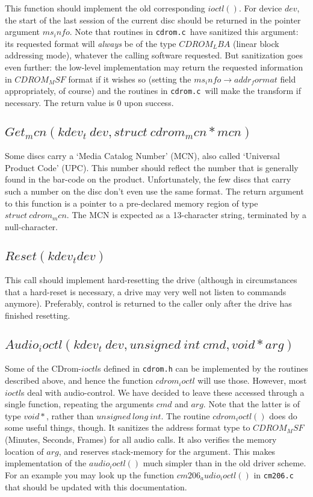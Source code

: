 \documentclass{article}
\def\cdrom{{\sc CDrom}}
\def\cdromc{{\tt cdrom.c}}
\begin{document}
This function should implement the old corresponding $ioctl()$. For
device $dev$, the start of the last session of the current disc should
be returned in the pointer argument $ms_info$. Note that routines in \cdromc\ have sanitized this argument: its
requested format will {\em always\/} be of the type $CDROM_LBA$
(linear block addressing mode), whatever the calling software
requested. But sanitization goes even further: the low-level
implementation may return the requested information in $CDROM_MSF$
format if it wishes so (setting the $ms_info\rightarrow addr_format$
field appropriately, of course) and the routines in \cdromc\ will make
the transform if necessary. The return value is 0 upon success.

\subsection{$Get_mcn(kdev_t\ dev, struct\ cdrom_mcn * mcn)$}

Some discs carry a `Media Catalog Number' (MCN), also called
`Universal Product Code' (UPC). This number should reflect the number that
is generally found in the bar-code on the product. Unfortunately, the
few discs that carry such a number on the disc don't even use the same
format. The return argument to this function is a pointer to a
pre-declared memory region of type $struct\ cdrom_mcn$. The MCN is
expected as a 13-character string, terminated by a null-character.

\subsection{$Reset(kdev_t dev)$}

This call should implement hard-resetting the drive (although in
circumstances that a hard-reset is necessary, a drive may very well
not listen to commands anymore). Preferably, control is returned to the
caller only after the drive has finished resetting.

\subsection{$Audio_ioctl(kdev_t\ dev, unsigned\ int\ cmd, void *
arg)$}

Some of the \cdrom-$ioctl$s defined in {\tt cdrom.h} can be
implemented by the routines described above, and hence the function
$cdrom_ioctl$ will use those. However, most $ioctl$s deal with
audio-control. We have decided to leave these accessed through a
single function, repeating the arguments $cmd$ and $arg$. Note that
the latter is of type $void*{}$, rather than $unsigned\ long\
int$. The routine $cdrom_ioctl()$ does do some useful things,
though. It sanitizes the address format type to $CDROM_MSF$ (Minutes,
Seconds, Frames) for all audio calls. It also verifies the memory
location of $arg$, and reserves stack-memory for the argument. This
makes implementation of the $audio_ioctl()$ much simpler than in the
old driver scheme. For an example you may look up the function
$cm206_audio_ioctl()$ in {\tt cm206.c} that should be updated with
this documentation. 
\end{document}
